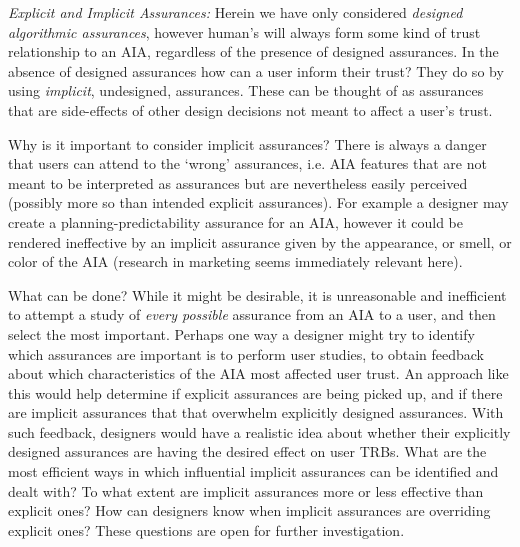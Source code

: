 \emph{Explicit and Implicit Assurances:}
Herein we have only considered \emph{designed algorithmic assurances}, however human's will always form some kind of trust relationship to an AIA, regardless of the presence of designed assurances. In the absence of designed assurances how can a user inform their trust? They do so by using \emph{implicit}, undesigned, assurances. These can be thought of as assurances that are side-effects of other design decisions not meant to affect a user's trust.

Why is it important to consider implicit assurances? There is always a danger that users can attend to the `wrong' assurances, i.e. AIA features that are not meant to be interpreted as assurances but are nevertheless easily perceived (possibly more so than intended explicit assurances). For example a designer may create a planning-predictability assurance for an AIA, however it could be rendered ineffective by an implicit assurance given by the appearance, or smell, or color of the AIA (research in marketing seems immediately relevant here).

What can be done? While it might be desirable, it is unreasonable and inefficient to attempt a study of \emph{every possible} assurance from an AIA to a user, and then select the most important. Perhaps one way a designer might try to identify which assurances are important is to perform user studies, to obtain feedback about which characteristics of the AIA most affected user trust. An approach like this would help determine if explicit assurances are being picked up, and if there are implicit assurances that that overwhelm explicitly designed assurances. With such feedback, designers would have a realistic idea about whether their explicitly designed assurances are having the desired effect on user TRBs. What are the most efficient ways in which influential implicit assurances can be identified and dealt with? To what extent are implicit assurances more or less effective than explicit ones? How can designers know when implicit assurances are overriding explicit ones? These questions are open for further investigation.
